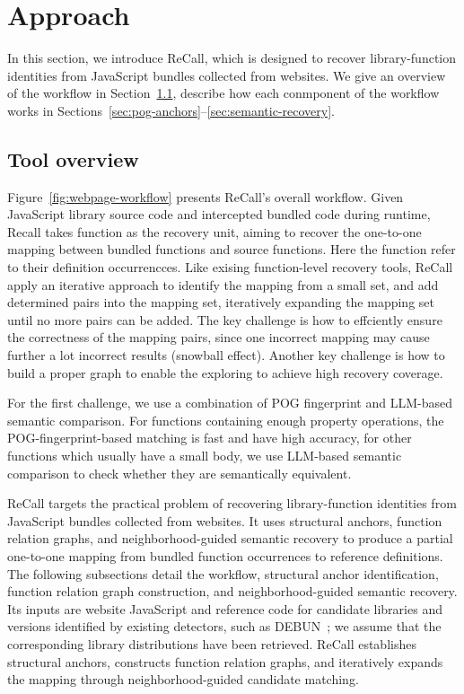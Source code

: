 \section{Approach}
\label{sec:approach}

In this section, we introduce ReCall, which is designed to recover library-function identities from JavaScript bundles collected from websites. We give an overview of the workflow in Section~\ref{sec:approach-overview}, describe how each conmponent of the workflow works in Sections~\ref{sec:pog-anchors}--\ref{sec:semantic-recovery}.


\subsection{Tool overview}
\label{sec:approach-overview}


Figure~\ref{fig:webpage-workflow} presents ReCall's overall workflow. Given JavaScript library source code and intercepted bundled code during runtime,
Recall takes function as the recovery unit, aiming to recover the one-to-one mapping between bundled functions and source functions. Here the function refer to their definition occurrencces. 
Like exising function-level recovery tools, ReCall apply an iterative approach to identify the mapping from a small set, and add determined pairs into the mapping set,
iteratively expanding the mapping set until no more pairs can be added. The key challenge is how to effciently ensure the correctness of the mapping pairs, since one incorrect mapping
may cause further a lot incorrect results (snowball effect). Another key challenge is how to build a proper graph to enable the exploring to achieve high recovery coverage.

For the first challenge, we use a combination of POG fingerprint and LLM-based semantic comparison. For functions containing enough property operations, the POG-fingerprint-based matching is fast and have high accuracy,
for other functions which usually have a small body, we use LLM-based semantic comparison to check whether they are semantically equivalent. 


 ReCall targets the practical problem of recovering library-function identities from JavaScript bundles collected from websites. It uses structural anchors, function relation graphs, and neighborhood-guided semantic recovery to produce a partial one-to-one mapping from bundled function occurrences to reference definitions. The following subsections detail the workflow, structural anchor identification, function relation graph construction, and neighborhood-guided semantic recovery.
Its inputs are website JavaScript and reference code for candidate libraries and versions identified by existing detectors, such as DEBUN~\cite{kim2025debun}; we assume that the corresponding library distributions have been retrieved. ReCall establishes structural anchors, constructs function relation graphs, and iteratively expands the mapping through neighborhood-guided candidate matching.

